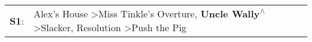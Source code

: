 \begin{supertabular}{p{0.03\textwidth}p{0.92\textwidth}}
 \textbf{S1}:  &  Alex's House\textsuperscript{} \textgreater \enspace Miss Tinkle's Overture\textsuperscript{}, \enspace \textbf{Uncle Wally\textsuperscript{$\wedge$}} \textgreater \enspace Slacker\textsuperscript{}, \enspace Resolution\textsuperscript{} \textgreater \enspace Push the Pig\textsuperscript{}  \enspace  \\
\end{supertabular}

